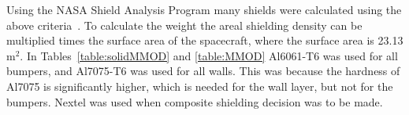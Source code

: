 \documentclass[paper=letter, fontsize=11pt]{scrartcl} %
\numberwithin{equation}{section} %
\numberwithin{figure}{section} %
\numberwithin{table}{section} %
\begin{document}
Using the NASA Shield Analysis Program many shields were calculated using the above criteria~\cite{ryan2010micrometeoroid}. To calculate the weight the areal shielding density can be multiplied times the surface area of the spacecraft, where the surface area is 23.13 m$^2$. In Tables~\ref{table:solidMMOD} and \ref{table:MMOD} Al6061-T6 was used for all bumpers, and Al7075-T6 was used for all walls. This was because the hardness of Al7075 is significantly higher, which is needed for the wall layer, but not for the bumpers. Nextel was used when composite shielding decision was to be made.

\end{document}
